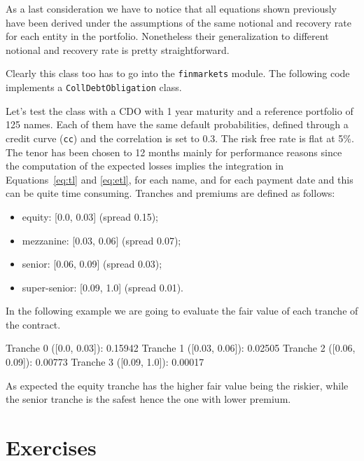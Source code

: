 As a last consideration we have to notice that all equations shown previously have been derived under the assumptions of the same notional and recovery rate for each entity in the portfolio. Nonetheless their generalization to different notional and recovery rate is pretty straightforward.
 
\begin{finmarkets}
Clearly this class too has to go into the \texttt{finmarkets} module. The following code implements a \texttt{CollDebtObligation} class.
\end{finmarkets}


Let's test the class with a CDO with 1 year maturity and a reference portfolio of 125 names. Each of them have the same default probabilities, defined through a credit curve (\texttt{cc}) and the correlation is set to 0.3. The risk free rate is flat at 5\%. The tenor has been chosen to 12 months mainly for performance reasons since the computation of the expected losses implies the integration in Equations~\ref{eq:tl} and \ref{eq:etl}, for each name, and for each payment date and this can be quite time consuming.
Tranches and premiums are defined as follows:
\begin{itemize}
	\item equity: [0.0, 0.03] (spread 0.15);
	\item mezzanine: [0.03, 0.06] (spread 0.07);
	\item senior: [0.06, 0.09] (spread 0.03);
	\item super-senior: [0.09, 1.0] (spread 0.01).
\end{itemize}

In the following example we are going to evaluate the fair value of each tranche of the contract.


\begin{ioutput}
Tranche 0 ([0.0, 0.03]): 0.15942
Tranche 1 ([0.03, 0.06]): 0.02505
Tranche 2 ([0.06, 0.09]): 0.00773
Tranche 3 ([0.09, 1.0]): 0.00017
\end{ioutput}

As expected the equity tranche has the higher fair value being the riskier, while the senior tranche is the safest hence the one with lower premium.

\section*{Exercises}


